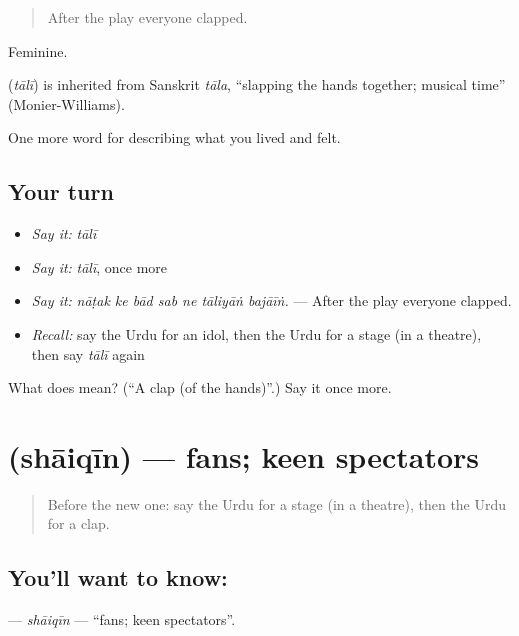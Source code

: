 \begin{quote}
After the play everyone clapped.
\end{quote}

Feminine.

\begin{cousinweb}
\textbf{} (\emph{tālī}) is inherited from Sanskrit \emph{tāla}, \textquotedblleft{}slapping the hands together; musical time\textquotedblright{} (Monier-Williams).
\end{cousinweb}

\begin{grammarlens}[title={What you've built}]
One more word for describing what you lived and felt.
\end{grammarlens}

\subsection*{Your turn}
\begin{itemize}
\raggedright
  \item \emph{Say it:} \emph{tālī}
  \item \emph{Say it:} \emph{tālī}, once more
  \item \emph{Say it:} \emph{nāṭak ke bād sab ne tāliyāṅ bajāīṅ.} — After the play everyone clapped.
  \item \emph{Recall:} say the Urdu for an idol, then the Urdu for a stage (in a theatre), then say \emph{tālī} again
\end{itemize}

\begin{tcolorbox}[breakable,colback=teal!4,colframe=teal!35!black,title={Before you move on}]
What does  mean? (\textquotedblleft{}A clap (of the hands)\textquotedblright{}.) Say it once more.
\end{tcolorbox}
\section[\texorpdfstring{\ur{شائقین} (shāiqīn)}{شائقین (shāiqīn)}]{ (shāiqīn) — fans; keen spectators}

\label{lesson:UR-C517-shaiqin}



\begin{quote}
Before the new one: say the Urdu for a stage (in a theatre), then the Urdu for a clap.
\end{quote}

\subsection*{You'll want to know: }
\textbf{} — \emph{shāiqīn} — \textquotedblleft{}fans; keen spectators\textquotedblright{}.

